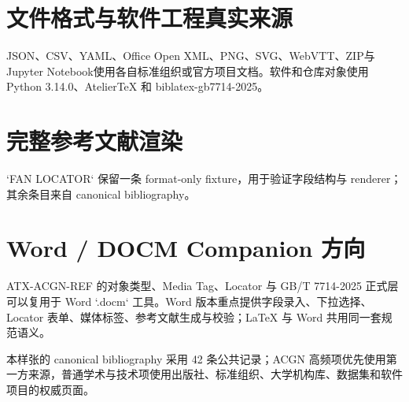 \documentclass[profile=editorial,titlelayout=\AtelierSpecimenTitleLayout]{atelier}
\begin{document}
\section{文件格式与软件工程真实来源}
JSON\cite{rfc8259_json}、CSV\cite{rfc4180_csv}、YAML\cite{yaml_122}、Office Open XML\cite{ecma376_ooxml}、PNG\cite{w3c_png3}、SVG\cite{w3c_svg2}、WebVTT\cite{w3c_webvtt}、ZIP\cite{pkware_zip_appnote}与 Jupyter Notebook\cite{jupyter_nbformat}使用各自标准组织或官方项目文档。软件和仓库对象使用 Python 3.14.0\cite{python_3140}、AtelierTeX\cite{ateliertex_repo} 和 biblatex-gb7714-2025\cite{biblatex_gb7714_repo}。

\section{完整参考文献渲染}
`FAN LOCATOR` 保留一条 format-only fixture，用于验证字段结构与 renderer；其余条目来自 canonical bibliography。
\nocite{fan_locator_fixture}
\ifstrequal{\AtelierActualGBStyle}{gb7714-2025}{\nocite{vaswani2017attention_preprint}}{}
\printbibliography

\section{Word / DOCM Companion 方向}
ATX-ACGN-REF 的对象类型、Media Tag、Locator 与 GB/T 7714-2025 正式层可以复用于 Word `.docm` 工具。Word 版本重点提供字段录入、下拉选择、Locator 表单、媒体标签、参考文献生成与校验；LaTeX 与 Word 共用同一套规范语义。

\vfill
{\footnotesize 本样张的 canonical bibliography 采用 42 条公共记录；ACGN 高频项优先使用第一方来源，普通学术与技术项使用出版社、标准组织、大学机构库、数据集和软件项目的权威页面。}
\end{document}
